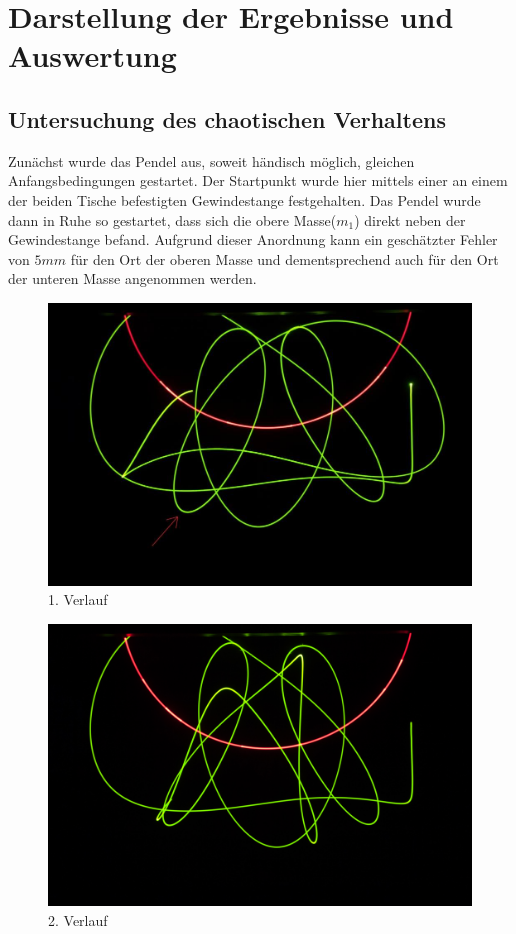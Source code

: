 \section{Darstellung der Ergebnisse und Auswertung}

\subsection{Untersuchung des chaotischen Verhaltens}
Zunächst wurde das Pendel aus, soweit händisch möglich, gleichen Anfangsbedingungen gestartet. Der Startpunkt wurde hier mittels einer an einem der beiden Tische befestigten Gewindestange festgehalten. Das Pendel wurde dann in Ruhe so gestartet, dass sich die obere Masse($ m_{1} $) direkt neben der Gewindestange befand. Aufgrund dieser Anordnung kann ein geschätzter Fehler von $ 5  mm $ für den Ort der oberen Masse und dementsprechend auch für den Ort der unteren Masse angenommen werden.


\begin{figure}
        \includegraphics[width=.9\textwidth]{images/pendel-6_.jpg}
\caption{1. Verlauf}
\label{pendel-6}
\end{figure}

\begin{figure}
        \includegraphics[width=.9\textwidth]{images/pendel-10.jpg}
\caption{2. Verlauf}
\label{pendel-10}
\end{figure}


